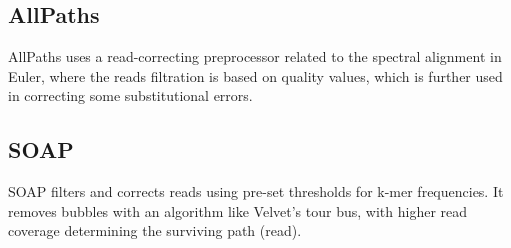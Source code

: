 \documentclass[12pt]{llncs}
\begin{document}
\subsection{AllPaths}
AllPaths \cite{AllPaths} uses a read-correcting preprocessor related to the spectral alignment in Euler, where the reads filtration is based on quality values, which is further used in correcting some substitutional errors. 

\subsection{SOAP}
SOAP \cite{Soap} filters and corrects reads using pre-set thresholds for k-mer frequencies. It removes bubbles with an algorithm like Velvet's tour bus, with higher read coverage determining the surviving path (read).
\end{document}
